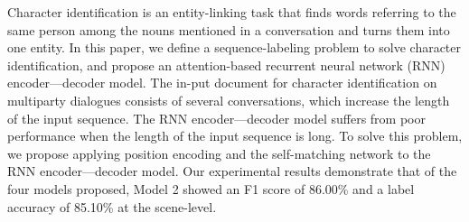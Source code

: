 Character identification is an entity-linking task that finds words referring to the same person among the nouns mentioned in a conversation and turns them into one entity. In this paper, we define a sequence-labeling problem to solve character identification, and propose an attention-based recurrent neural network (RNN) encoder---decoder model. The in-put document for character identification on multiparty dialogues consists of several conversations, which increase the length of the input sequence. The RNN encoder---decoder model suffers from poor performance when the length of the input sequence is long. To solve this problem, we propose applying position encoding and the self-matching network to the RNN encoder---decoder model. Our experimental results demonstrate that of the four models proposed, Model 2 showed an F1 score of 86.00\% and a label accuracy of 85.10\% at the scene-level.
